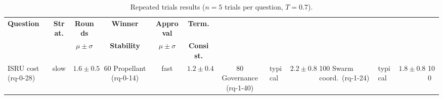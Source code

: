 \begin{table}[ht]
\centering
\caption{Repeated trials results ($n = 5$ trials per question, $T = 0.7$).}
\label{tab:repeated_trials}
\begin{tabular}{@{}lcccccc@{}}
\toprule
\textbf{Question} & \textbf{Strat.} & \textbf{Rounds} & \textbf{Winner} & \textbf{Approval} & \textbf{Term.} \\
 & & $\mu \pm \sigma$ & \textbf{Stability} & $\mu \pm \sigma$ & \textbf{Consist.} \\
\midrule
ISRU cost (rq-0-28) & slow & $1.6 \pm 0.5$ & 60%
Propellant (rq-0-14) & fast & $1.2 \pm 0.4$ & 80%
Governance (rq-1-40) & typical & $2.2 \pm 0.8$ & 100%
Swarm coord.\ (rq-1-24) & typical & $1.8 \pm 0.8$ & 100%
\bottomrule
\end{tabular}
\end{table}